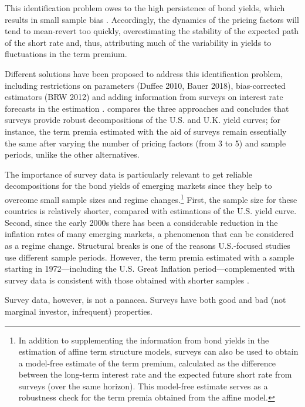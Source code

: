 {This identification problem owes to the high persistence of bond yields, which results in small sample bias \citep{KimOrphanides:2012}. Accordingly, the dynamics of the pricing factors will tend to mean-revert too quickly, overestimating the stability of the expected path of the short rate and, thus, attributing much of the variability in yields to fluctuations in the term premium.

Different solutions have been proposed to address this identification problem, including restrictions on parameters (Duffee 2010, Bauer 2018), bias-corrected estimators (BRW 2012) and adding information from surveys on interest rate forecasts in the estimation \citep{KimWright:2005,KimOrphanides:2012}.
\cite{Guimaraes:2014} compares the three approaches and concludes that surveys provide robust decompositions of the U.S. and U.K. yield curves; for instance, the term premia estimated with the aid of surveys remain essentially the same after varying the number of pricing factors (from 3 to 5) and sample periods, unlike the other alternatives.

The importance of survey data is particularly relevant to get reliable decompositions for the bond yields of emerging markets since they help to overcome small sample sizes and regime changes.\footnote{ In addition to supplementing the information from bond yields in the estimation of affine term structure models, surveys can also be used to obtain a model-free estimate of the term premium, calculated as the difference between the long-term interest rate and the expected future short rate from surveys (over the same horizon). This model-free estimate serves as a robustness check for the term premia obtained from the affine model.}
First, the sample size for these countries is relatively shorter, compared with estimations of the U.S. yield curve.
Second, since the early 2000s there has been a considerable reduction in the inflation rates of many emerging markets, a phenomenon that can be considered as a regime change. 
Structural breaks is one of the reasons U.S.-focused studies use different sample periods.
However, the term premia estimated with a sample starting in 1972---including the U.S. Great Inflation period---complemented with survey data is consistent with those obtained with shorter samples \citep{Guimaraes:2014}.

 Survey data, however, is not a panacea. Surveys have both good and bad (not marginal investor, infrequent) properties.

}
